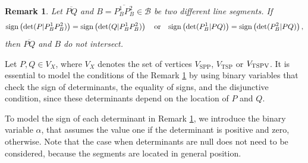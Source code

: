 \documentclass[a4paper,  review, authoryear, 1p.]{elsarticle}
\newcommand{\VSPP}{{V_{\text{SPP}}}}
\newcommand{\VTSP}{{V_{\text{TSP}}}}
\newtheorem{remark}{Remark}
\newcommand{\determinant}[3]{\det({#1|#2#3})}
\begin{document}
		
		\begin{remark}\label{rem:determinants}
			Let $\overline{PQ}$ and $B=\overline{P_B^1P_B^2}\in\mathcal B$ be two different line segments. 
			If
			\begin{equation*}
				\normalfont{\text{sign}}\left(\determinant{P}{P_B^1}{P_B^2}\right) = \normalfont{\text{sign}}\left(\determinant{Q}{P_B^1}{P_B^2}\right)
				\quad
				\text{or}
				\quad
				\normalfont{\text{sign}}\left(\determinant{P_B^1}{P}{Q}\right) = \normalfont{\text{sign}}\left(\determinant{P_B^2}{P}{Q}\right)
				,
			\end{equation*}
			then $\overline{PQ}$ and $B$ do not intersect.
		\end{remark}
		
		
		
		
		Let $P,Q\in V_X$, where $V_X$ denotes the set of vertices $\VSPP$, $\VTSP$ or $V_{\rm{TSPV}}$. It is essential to model the conditions of the Remark \ref{rem:determinants} by using binary variables that check the sign of determinants, the equality of signs, and the disjunctive condition, since these determinants depend on the location of $P$ and $Q$.
		
		\newcommand{\LS}[3]{L(#1|#2#3)}
		\newcommand{\US}[3]{U(#1|#2#3)}
		\newcommand{\alphamas}[3]{\alpha(#1|#2#3)}
		\newcommand{\alphamenos}[3]{\alpha^{-}(#1|#2#3)}
		\newcommand{\alphapunto}[3]{\alpha^{\cdotp}(#1|#2#3)}
		
		To model the sign of each determinant in Remark \ref{rem:determinants}, we introduce the binary variable $\alpha$, that assumes the value one if the determinant is positive and zero, otherwise. Note that the case when determinants are null does not need to be considered, because the segments are located in general position.
		
\end{document}
